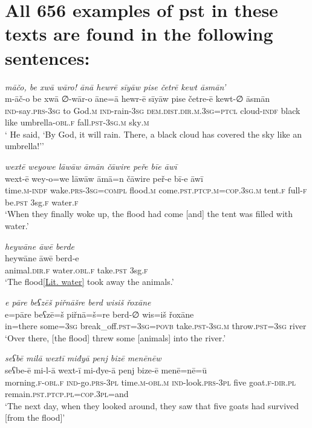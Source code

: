 \chapter{All 656 examples of pst in these texts are found in the following sentences:}

\ea \label{ZB.17}
\textit{māčo, be xwā wāro! ānā hewrē sīyāw pise četrē kewt āsmān’} \\ 
\gll m-āč-o be xwā ∅-wār-o āne=ā hewr-ē sīyāw pise četre-ē kewt-∅ āsmān \\ 
 \textsc{ind-}say\textsc{.prs}\textsc{-3sg} to God\textsc{.m} \textsc{ind-}rain\textsc{-3sg} \textsc{dem.dist}\textsc{.dir}\textsc{.m}\textsc{.3sg}=\textsc{ptcl} cloud\textsc{-indf} black like umbrella\textsc{-obl}\textsc{.f} fall\textsc{.pst}\textsc{-3sg}\textsc{.m} sky\textsc{.m} \\ 
\glt ` He said, ‘By God, it will rain. There, a black cloud has covered the sky like an umbrella!’'
\z 
 
\ea \label{ZB.20}
\textit{wextē weyowe lāwāw āmān čāwire peře bīe āwī} \\ 
\gll wext-ē wey-o=we lāwāw āmā=n čāwire peř-e bī-e āwī \\ 
 time\textsc{.m}\textsc{-indf} wake\textsc{.prs}\textsc{-3sg}\textsc{=compl} flood\textsc{.m} come\textsc{.pst}\textsc{.ptcp}\textsc{.m}\textsc{=cop}\textsc{.3sg}\textsc{.m} tent\textsc{.f} full\textsc{-f} be\textsc{.pst} 3sg\textsc{.f} water\textsc{.f} \\ 
\glt `When they finally woke up, the flood had come [and] the tent was filled with water.'
\z 
 
\ea \label{ZB.21}
\textit{heywāne āwē berde} \\ 
\gll heywāne āwē berd-e \\ 
 animal\textsc{.dir}\textsc{.f} water\textsc{.obl}\textsc{.f} take\textsc{.pst} 3sg\textsc{.f} \\ 
\glt `The flood\ref{Lit. water} took away the animals.'
\z 
 
\ea \label{ZB.22}
\textit{e pāre beʕzēš piřnāšre berd wisiš řoxāne} \\ 
\gll e=pāre beʕzē=š piřnā=š=re berd-∅ wis=iš řoxāne \\ 
 in=there some\textsc{=3sg} break\_off\textsc{.pst}\textsc{=3sg}\textsc{=\textsc{povb}} take\textsc{.pst}\textsc{-3sg}\textsc{.m} throw\textsc{.pst}\textsc{=3sg} river \\ 
\glt `Over there, [the flood] threw some [animals] into the river.'
\z 
 
\ea \label{ZB.27}
\textit{seʕbē milā wextī miđyā penj bizē menēnēw} \\ 
\gll seʕbe-ē mi-l-ā wext-ī mi-đye-ā penj bize-ē menē=nē=ū \\ 
 morning\textsc{.f}\textsc{-obl}\textsc{.f} \textsc{ind-}go\textsc{.prs}\textsc{-3pl} time\textsc{.m}\textsc{-obl}\textsc{.m} \textsc{ind-}look\textsc{.prs}\textsc{-3pl} five goat\textsc{.f}\textsc{-dir}\textsc{.pl} remain\textsc{.pst}\textsc{.ptcp}\textsc{.pl}\textsc{=cop}\textsc{.3pl}=and \\ 
\glt `The next day, when they looked around, they saw that five goats had survived [from the flood]'
\z 
 
